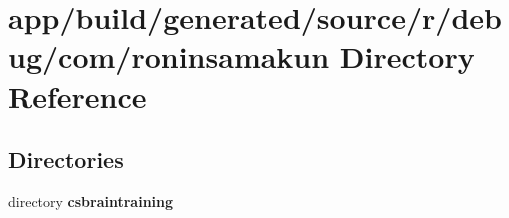\section{app/build/generated/source/r/debug/com/roninsamakun Directory Reference}
\label{dir_d2a9b6936d8fcd97d8ba80d8c0cd3d3e}
\subsection*{Directories}
\begin{DoxyCompactItemize}
\item 
directory {\bf csbraintraining}
\end{DoxyCompactItemize}

